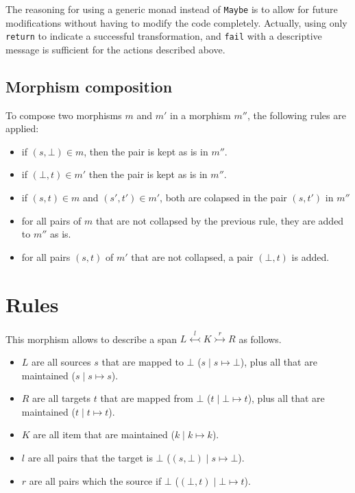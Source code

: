 \documentclass[a4paper]{report}
\begin{document}
The reasoning for using a generic monad instead of \texttt{Maybe} is to allow for future modifications without having to modify the code completely. Actually, using only \texttt{return} to indicate a successful transformation, and \texttt{fail} with a descriptive message is sufficient for the actions described above.

\subsection{Morphism composition}
To compose two morphisms $m$ and $m'$ in a morphism $m''$, the following rules are applied:
\begin{itemize}
	\item if $(s, \bot) \in m$, then the pair is kept as is in $m''$.
	\item if $(\bot, t) \in m'$ then the pair is kept as is in $m''$.
	\item if $(s, t) \in m$ and $(s', t') \in m'$, both are colapsed in the pair $(s, t')$ in $m''$
	\item for all pairs of $m$ that are not collapsed by the previous rule, they are added to $m''$ as is.
	\item for all pairs $(s, t)$ of $m'$ that are not collapsed, a pair $(\bot, t)$ is added.
\end{itemize}

\section{Rules}
This morphism allows to describe a span $L \overset{l}{\leftarrowtail} K \overset{r}{\rightarrowtail} R$ as follows.

\begin{itemize}
	\item $L$ are all sources $s$ that are mapped to $\bot$ ($s \mid s \mapsto \bot$), plus all that are maintained ($s \mid s \mapsto s$).
	\item $R$ are all targets $t$ that are mapped from $\bot$ ($t \mid \bot \mapsto t$), plus all that are maintained ($t \mid t \mapsto t$).
	\item $K$ are all item that are maintained ($k \mid k \mapsto k$).
	\item $l$ are all pairs that the target is $\bot$ ($(s, \bot) \mid s \mapsto \bot$).
	\item $r$ are all pairs which the source if $\bot$ ($(\bot, t) \mid \bot \mapsto t$).
\end{itemize}
\end{document}
